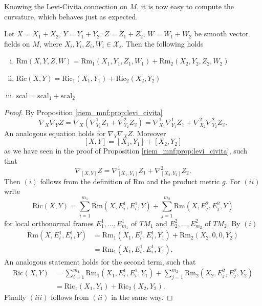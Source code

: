 Knowing the Levi-Civita connection on $M$, it is now easy to compute the curvature, which behaves just as expected.

\begin{corollary}
    Let $X = X_1 + X_2,\, Y = Y_1 + Y_2, \,Z = Z_1 + Z_2,\, W = W_1 + W_2$ be smooth vector fields on $M$, where $X_i,Y_i,Z_i,W_i \in \mathscr{X_i}$. Then the following holds
    \begin{enumerate}[(i)]
        \item $\mathrm{Rm}(X,Y,Z,W) = \mathrm{Rm}_1(X_1,Y_1,Z_1,W_1) + \mathrm{Rm}_2(X_2,Y_2,Z_2,W_2)$
        \item $\mathrm{Ric}(X,Y) = \mathrm{Ric}_1(X_1,Y_1) + \mathrm{Ric}_2(X_2,Y_2)$
        \item $\mathrm{scal} = \mathrm{scal}_1 + \mathrm{scal}_2$
    \end{enumerate}
\end{corollary}

\begin{proof}
    By Proposition \ref{riem_mnf:prop:levi_civita}
    \[
    \nabla_X\nabla_YZ = \nabla_X(\nabla^1_{Y_1}Z_1 + \nabla^2_{Y_2}Z_2) = \nabla_{X_1}^1\nabla^1_{Y_1}Z_1 + \nabla_{X_2}^2\nabla^2_{Y_2}Z_2.
    \]
    An analogous equation holds for $\nabla_Y\nabla_XZ$. Moreover
    \[
    [X,Y] = [X_1,Y_1] + [X_2,Y_2]
    \]
    as we have seen in the proof of Proposition \ref{riem_mnf:prop:levi_civita}, such that 
    \[
    \nabla_{[X,Y]}Z = \nabla^1_{[X_1,Y_1]}Z_1 +  \nabla^2_{[X_2,Y_2]}Z_2.
    \]
    Then $(i)$ follows from the definition of Rm and the product metric $g$. For $(ii)$ write 
    \[
    \mathrm{Ric}(X,Y) = \sum_{i=1}^{m_1} \mathrm{Rm}(X,E_i^1,E_i^1,Y) + \sum_{j=1}^{m_2} \mathrm{Rm}(X,E_j^2,E_j^2,Y)
    \]
    for local orthonormal frames $E_1^1,\ldots,E_{m_1}^1$ of $TM_1$ and $E_2^2,\ldots,E_{m_2}^2$ of $TM_2$. By $(i)$
    \begin{align*}
        \mathrm{Rm}(X,E_i^1,E_i^1,Y) &= \mathrm{Rm}_1(X_1,E_i^1,E_i^1,Y_1) + \mathrm{Rm}_2(X_2,0,0,Y_2)\\
        &= \mathrm{Rm}_1(X_1,E_i^1,E_i^1,Y_1).
    \end{align*}
    An analogous statement holds for the second term, such that 
    \begin{align*}
        \mathrm{Ric}(X,Y) &= \sum_{i=1}^{m_1} \mathrm{Rm}_1(X_1,E_i^1,E_i^1,Y_1) + \sum_{j=1}^{m_2} \mathrm{Rm}_2(X_2,E_j^2,E_j^2,Y_2) \\
        &= \mathrm{Ric}_1(X_1,Y_1) + \mathrm{Ric}_2(X_2,Y_2).
    \end{align*}
    Finally $(iii)$ follows from $(ii)$ in the same way.
\end{proof}

